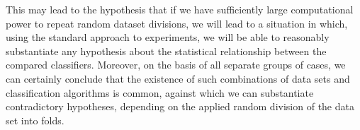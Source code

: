 \documentclass[12pt,a4paper]{report}
\begin{document}
This may lead to the hypothesis that if we have sufficiently large computational power to repeat random dataset divisions, we will lead to a situation in which, using the standard approach to experiments, we will be able to reasonably substantiate any hypothesis about the statistical relationship between the compared classifiers. Moreover, on the basis of all separate groups of cases, we can certainly conclude that the existence of such combinations of data sets and classification algorithms is common, against which we can substantiate contradictory hypotheses, depending on the applied random division of the data set into folds.


\begin{table}[!h]
	\centering
	\caption{Example}
	\label{tab:triple}
\end{table}
\end{document}
